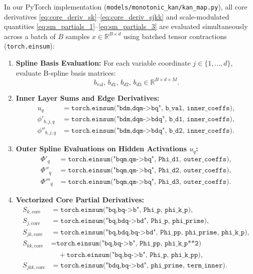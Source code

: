 \documentclass[11pt,a4paper]{article}
\theoremstyle{plain}
\theoremstyle{definition}
\theoremstyle{remark}
\begin{document}
In our PyTorch implementation (\texttt{models/monotonic\_kan/kan\_map.py}), all core derivatives \eqref{eq:core_deriv_sk}--\eqref{eq:core_deriv_sjkk} and scale-modulated quantities \eqref{eq:sm_partials_1}--\eqref{eq:sm_partials_3} are evaluated simultaneously across a batch of $B$ samples $x \in \mathbb{R}^{B \times d}$ using batched tensor contractions (\texttt{torch.einsum}):

\begin{enumerate}
    \item \textbf{Spline Basis Evaluation:} For each variable coordinate $j \in \{1, \dots, d\}$, evaluate B-spline basis matrices:
    \begin{equation}
        b_{\text{val}}, \, b_{d1}, \, b_{d2}, \, b_{d3} \in \mathbb{R}^{B \times d \times M}.
    \end{equation}

    \item \textbf{Inner Layer Sums and Edge Derivatives:}
    \begin{align}
        u_q &= \texttt{torch.einsum("bdm,dqm->bq", b\_val, inner\_coeffs)}, \\
        \phi'_{b, j, q} &= \texttt{torch.einsum("bdm,dqm->bdq", b\_d1, inner\_coeffs)}, \\
        \phi''_{b, j, q} &= \texttt{torch.einsum("bdm,dqm->bdq", b\_d2, inner\_coeffs)}.
    \end{align}

    \item \textbf{Outer Spline Evaluations on Hidden Activations $u_q$:}
    \begin{align}
        \Phi'_q &= \texttt{torch.einsum("bqm,qm->bq", Phi\_d1, outer\_coeffs)}, \\
        \Phi''_q &= \texttt{torch.einsum("bqm,qm->bq", Phi\_d2, outer\_coeffs)}, \\
        \Phi'''_q &= \texttt{torch.einsum("bqm,qm->bq", Phi\_d3, outer\_coeffs)}.
    \end{align}

    \item \textbf{Vectorized Core Partial Derivatives:}
    \begin{align}
        S_{k, \text{core}} &= \texttt{torch.einsum("bq,bq->b", Phi\_p, phi\_k\_p)}, \\
        S_{j, \text{core}} &= \texttt{torch.einsum("bq,bdq->bd", Phi\_p, phi\_prime)}, \\
        S_{jk, \text{core}} &= \texttt{torch.einsum("bq,bdq,bq->bd", Phi\_pp, phi\_prime, phi\_k\_p)}, \\
        S_{kk, \text{core}} &= \texttt{torch.einsum("bq,bq->b", Phi\_pp, phi\_k\_p**2)} \nonumber \\
        &\quad + \texttt{torch.einsum("bq,bq->b", Phi\_p, phi\_k\_pp)}, \\
        S_{jkk, \text{core}} &= \texttt{torch.einsum("bdq,bq->bd", phi\_prime, term\_inner)}.
    \end{align}
\end{enumerate}
\end{document}
